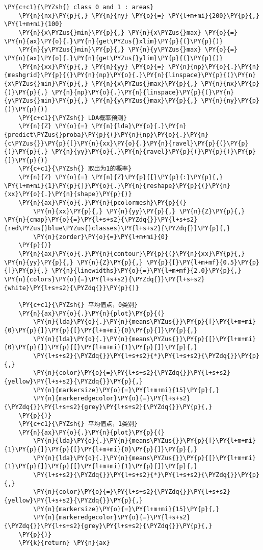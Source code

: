 \begin{Verbatim}[commandchars=\\\{\}]
    \PY{c+c1}{\PYZsh{} class 0 and 1 : areas}
    \PY{n}{nx}\PY{p}{,} \PY{n}{ny} \PY{o}{=} \PY{l+m+mi}{200}\PY{p}{,} \PY{l+m+mi}{100}
    \PY{n}{x\PYZus{}min}\PY{p}{,} \PY{n}{x\PYZus{}max} \PY{o}{=} \PY{n}{ax}\PY{o}{.}\PY{n}{get\PYZus{}xlim}\PY{p}{(}\PY{p}{)}
    \PY{n}{y\PYZus{}min}\PY{p}{,} \PY{n}{y\PYZus{}max} \PY{o}{=} \PY{n}{ax}\PY{o}{.}\PY{n}{get\PYZus{}ylim}\PY{p}{(}\PY{p}{)}
    \PY{n}{xx}\PY{p}{,} \PY{n}{yy} \PY{o}{=} \PY{n}{np}\PY{o}{.}\PY{n}{meshgrid}\PY{p}{(}\PY{n}{np}\PY{o}{.}\PY{n}{linspace}\PY{p}{(}\PY{n}{x\PYZus{}min}\PY{p}{,} \PY{n}{x\PYZus{}max}\PY{p}{,} \PY{n}{nx}\PY{p}{)}\PY{p}{,} \PY{n}{np}\PY{o}{.}\PY{n}{linspace}\PY{p}{(}\PY{n}{y\PYZus{}min}\PY{p}{,} \PY{n}{y\PYZus{}max}\PY{p}{,} \PY{n}{ny}\PY{p}{)}\PY{p}{)}
    \PY{c+c1}{\PYZsh{} LDA概率预测}
    \PY{n}{Z} \PY{o}{=} \PY{n}{lda}\PY{o}{.}\PY{n}{predict\PYZus{}proba}\PY{p}{(}\PY{n}{np}\PY{o}{.}\PY{n}{c\PYZus{}}\PY{p}{[}\PY{n}{xx}\PY{o}{.}\PY{n}{ravel}\PY{p}{(}\PY{p}{)}\PY{p}{,} \PY{n}{yy}\PY{o}{.}\PY{n}{ravel}\PY{p}{(}\PY{p}{)}\PY{p}{]}\PY{p}{)}
    \PY{c+c1}{\PYZsh{} 取出为1的概率}
    \PY{n}{Z} \PY{o}{=} \PY{n}{Z}\PY{p}{[}\PY{p}{:}\PY{p}{,} \PY{l+m+mi}{1}\PY{p}{]}\PY{o}{.}\PY{n}{reshape}\PY{p}{(}\PY{n}{xx}\PY{o}{.}\PY{n}{shape}\PY{p}{)}
    \PY{n}{ax}\PY{o}{.}\PY{n}{pcolormesh}\PY{p}{(}
        \PY{n}{xx}\PY{p}{,} \PY{n}{yy}\PY{p}{,} \PY{n}{Z}\PY{p}{,} \PY{n}{cmap}\PY{o}{=}\PY{l+s+s2}{\PYZdq{}}\PY{l+s+s2}{red\PYZus{}blue\PYZus{}classes}\PY{l+s+s2}{\PYZdq{}}\PY{p}{,} 
        \PY{n}{zorder}\PY{o}{=}\PY{l+m+mi}{0}
    \PY{p}{)}
    \PY{n}{ax}\PY{o}{.}\PY{n}{contour}\PY{p}{(}\PY{n}{xx}\PY{p}{,} \PY{n}{yy}\PY{p}{,} \PY{n}{Z}\PY{p}{,} \PY{p}{[}\PY{l+m+mf}{0.5}\PY{p}{]}\PY{p}{,} \PY{n}{linewidths}\PY{o}{=}\PY{l+m+mf}{2.0}\PY{p}{,} \PY{n}{colors}\PY{o}{=}\PY{l+s+s2}{\PYZdq{}}\PY{l+s+s2}{white}\PY{l+s+s2}{\PYZdq{}}\PY{p}{)}

    \PY{c+c1}{\PYZsh{} 平均值点，0类别}
    \PY{n}{ax}\PY{o}{.}\PY{n}{plot}\PY{p}{(}
        \PY{n}{lda}\PY{o}{.}\PY{n}{means\PYZus{}}\PY{p}{[}\PY{l+m+mi}{0}\PY{p}{]}\PY{p}{[}\PY{l+m+mi}{0}\PY{p}{]}\PY{p}{,}
        \PY{n}{lda}\PY{o}{.}\PY{n}{means\PYZus{}}\PY{p}{[}\PY{l+m+mi}{0}\PY{p}{]}\PY{p}{[}\PY{l+m+mi}{1}\PY{p}{]}\PY{p}{,}
        \PY{l+s+s2}{\PYZdq{}}\PY{l+s+s2}{*}\PY{l+s+s2}{\PYZdq{}}\PY{p}{,}
        \PY{n}{color}\PY{o}{=}\PY{l+s+s2}{\PYZdq{}}\PY{l+s+s2}{yellow}\PY{l+s+s2}{\PYZdq{}}\PY{p}{,}
        \PY{n}{markersize}\PY{o}{=}\PY{l+m+mi}{15}\PY{p}{,}
        \PY{n}{markeredgecolor}\PY{o}{=}\PY{l+s+s2}{\PYZdq{}}\PY{l+s+s2}{grey}\PY{l+s+s2}{\PYZdq{}}\PY{p}{,}
    \PY{p}{)}
    \PY{c+c1}{\PYZsh{} 平均值点，1类别}
    \PY{n}{ax}\PY{o}{.}\PY{n}{plot}\PY{p}{(}
        \PY{n}{lda}\PY{o}{.}\PY{n}{means\PYZus{}}\PY{p}{[}\PY{l+m+mi}{1}\PY{p}{]}\PY{p}{[}\PY{l+m+mi}{0}\PY{p}{]}\PY{p}{,}
        \PY{n}{lda}\PY{o}{.}\PY{n}{means\PYZus{}}\PY{p}{[}\PY{l+m+mi}{1}\PY{p}{]}\PY{p}{[}\PY{l+m+mi}{1}\PY{p}{]}\PY{p}{,}
        \PY{l+s+s2}{\PYZdq{}}\PY{l+s+s2}{*}\PY{l+s+s2}{\PYZdq{}}\PY{p}{,}
        \PY{n}{color}\PY{o}{=}\PY{l+s+s2}{\PYZdq{}}\PY{l+s+s2}{yellow}\PY{l+s+s2}{\PYZdq{}}\PY{p}{,}
        \PY{n}{markersize}\PY{o}{=}\PY{l+m+mi}{15}\PY{p}{,}
        \PY{n}{markeredgecolor}\PY{o}{=}\PY{l+s+s2}{\PYZdq{}}\PY{l+s+s2}{grey}\PY{l+s+s2}{\PYZdq{}}\PY{p}{,}
    \PY{p}{)}
    \PY{k}{return} \PY{n}{ax}


\end{Verbatim}
